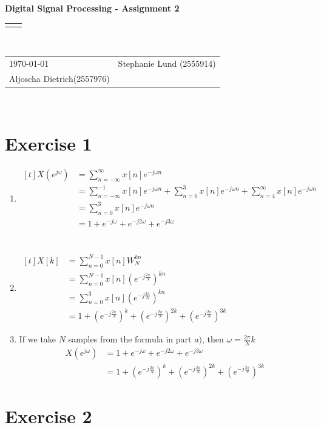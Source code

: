 \documentclass[12pt]{article}
\renewcommand{\title}[1]{\textbf{#1}\\}
\renewcommand{\line}{\begin{tabularx}{\textwidth}{X>{\raggedleft}X}\hline\\\end{tabularx}\\[-0.5cm]}
\newcommand{\leftright}[2]{\begin{tabularx}{\textwidth}{X>{\raggedleft}X}#1%
& #2\\\end{tabularx}\\[-0.5cm]}
\begin{document}
\title{Digital Signal Processing - Assignment 2}
\line
\leftright{\today}{Stephanie Lund (2555914)\\Aljoscha Dietrich(2557976)} %

\section*{Exercise 1}

\begin{enumerate}[label=\alph*)]
\item 
$\begin{aligned}[t]
X(e^{j\omega}) &= \sum_{n=-\infty}^{\infty} x[n]e^{-j\omega n}\\
&= \sum_{n=-\infty}^{-1} x[n]e^{-j\omega n} + \sum_{n=0}^{3} x[n]e^{-j\omega n} + \sum_{n=4}^{\infty} x[n]e^{-j\omega n} \\
&=  \sum_{n=0}^{3} x[n]e^{-j\omega n} \\
&= 1 + e^{-j\omega} + e^{-j2\omega} + e^{-j3\omega}\\
\end{aligned}$
\\ \\
\item 
$\begin{aligned}[t]
X[k] &= \sum_{n=0}^{N-1} x[n]W_{N}^{kn}\\
&= \sum_{n=0}^{N-1} x[n](e^{-j\frac{2\pi}{N}})^{kn} \\
&= \sum_{n=0}^{3} x[n] (e^{-j\frac{2\pi}{N}})^{kn} \\
&= 1 + (e^{-j\frac{2\pi}{N}})^{k} + (e^{-j\frac{2\pi}{N}})^{2k} + (e^{-j\frac{2\pi}{N}})^{3k}
\end{aligned}$

\item If we take $N$ samples from the formula in part $a)$, then $\omega = \frac{2\pi}{N}k$
\begin{align*}
X(e^{j\omega}) &= 1 + e^{-j\omega} + e^{-j2\omega} + e^{-j3\omega}\\
&= 1 + (e^{-j\frac{2\pi}{N}})^{k} + (e^{-j\frac{2\pi}{N}})^{2k} + (e^{-j\frac{2\pi}{N}})^{3k}
\end{align*}

\end{enumerate}

\section*{Exercise 2}
\end{document}
